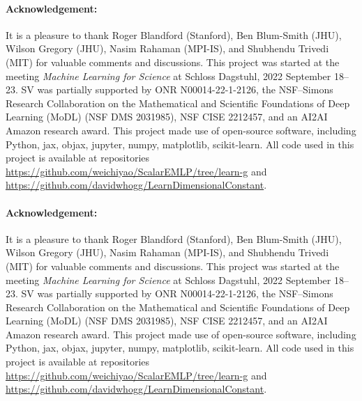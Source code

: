 \documentclass[]{article} %
\begin{document}
\newcommand{\ack}{\paragraph{Acknowledgement:}
It is a pleasure to thank
   Roger Blandford (Stanford),
   Ben Blum-Smith (JHU),
   Wilson Gregory (JHU),
   Nasim Rahaman (MPI-IS),
   and
   Shubhendu Trivedi (MIT)
for valuable comments and discussions.
This project was started at the meeting \textit{Machine Learning for Science} at Schloss Dagstuhl, 2022 September 18--23.
SV was partially supported by
   ONR N00014-22-1-2126, 
   the NSF–Simons Research Collaboration on the Mathematical and Scientific Foundations of Deep Learning (MoDL) (NSF DMS 2031985),
   NSF CISE 2212457,
   and
   an AI2AI Amazon research award.
This project made use of open-source software, including Python, jax, objax, jupyter, numpy, matplotlib, scikit-learn.
All code used in this project is available at repositories \url{https://github.com/weichiyao/ScalarEMLP/tree/learn-g} and \url{https://github.com/davidwhogg/LearnDimensionalConstant}.
}

\makeatletter
\if@preprint
  \ack
\else
  \if@accepted
    \ack
  \fi
\fi
\makeatother

{\raggedright


}

\appendix
\end{document}
